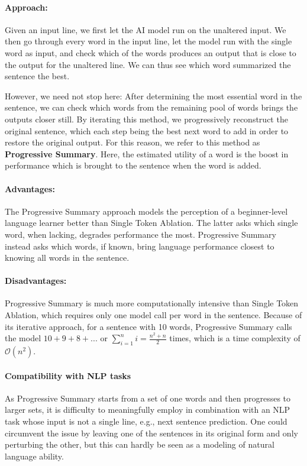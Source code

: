 \paragraph{Approach:}
Given an input line, we first let the AI model run on the unaltered input.
We then go through every word in the input line, let the model run with the single word as input, and check which of the words produces an output that is close to the output for the unaltered line.
We can thus see which word summarized the sentence the best.

However, we need not stop here:
After determining the most essential word in the sentence, we can check which words from the remaining pool of words brings the outputs closer still.
By iterating this method, we progressively reconstruct the original sentence, which each step being the best next word to add in order to restore the original output.
For this reason, we refer to this method as \textbf{Progressive Summary}.
Here, the estimated utility of a word is the boost in performance which is brought to the sentence when the word is added.

\paragraph{Advantages:}
The Progressive Summary approach models the perception of a beginner-level language learner better than Single Token Ablation.
The latter asks which single word, when lacking, degrades performance the most.
Progressive Summary instead asks which words, if known, bring language performance closest to knowing all words in the sentence.

\paragraph{Disadvantages:}
Progressive Summary is much more computationally intensive than Single Token Ablation, which requires only one model call per word in the sentence.
Because of its iterative approach, for a sentence with 10 words, Progressive Summary calls the model $10+9+8+... $ or $\sum_{i=1}^{n}i = \frac{n^2 + n}{2}$ times, which is a time complexity of $\mathcal{O}(n^2)$.


\paragraph{Compatibility with NLP tasks}
As Progressive Summary starts from a set of one words and then progresses to larger sets, it is difficulty to meaningfully employ in combination with an NLP task whose input is not a single line, e.g., next sentence prediction.
One could circumvent the issue by leaving one of the sentences in its original form and only perturbing the other, but this can hardly be seen as a modeling of natural language ability.


